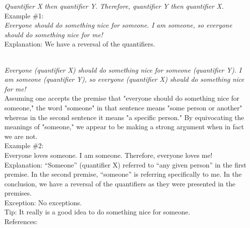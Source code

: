 \documentclass[a4paper,12pt,single,pdftex]{scrartcl}
\begin{document}
    
      {\em Quantifier X then quantifier Y.} \newline
{\em Therefore, quantifier Y then quantifier X.}
    \\

    
      Example \#1:
    \\

    
      {\em Everyone should do something nice for someone. I am someone, so everyone should do something nice for me!}
    \\

    
      Explanation: We have a reversal of the quantifiers. \newline

    \\

    
      {\em Everyone (quantifier X) should do something nice for someone (quantifier Y). I am someone (quantifier Y), so everyone (quantifier X) should do something nice for me!}
    \\

    
      Assuming one accepts the premise that "everyone should do something nice for someone," the word "someone" in that sentence means "some person or another" whereas in the second sentence it means "a specific person." By equivocating the meanings of "someone," we appear to be making a strong argument when in fact we are not.
    \\

    
      Example \#2:
    \\

    
      Everyone loves someone. \newline
I am someone. \newline
Therefore, everyone loves me!
    \\

    
      Explanation: “Someone” (quantifier X) referred to “any given person” in the first premise. In the second premise, “someone” is referring specifically to me. In the conclusion, we have a reversal of the quantifiers as they were presented in the premises.
    \\

    
      Exception: No exceptions.
    \\

    
      Tip: It really is a good idea to do something nice for someone.
    \\

    References:

    
      
\end{document}
